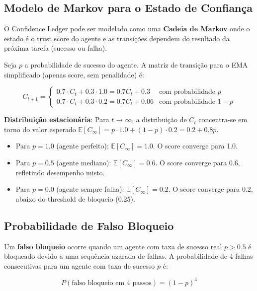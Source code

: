 \subsection{Modelo de Markov para o Estado de Confiança}

O Confidence Ledger pode ser modelado como uma \textbf{Cadeia de Markov} onde o estado é o trust score do agente e as transições dependem do resultado da próxima tarefa (sucesso ou falha).

Seja $p$ a probabilidade de sucesso do agente. A matriz de transição para o EMA simplificado (apenas score, sem penalidade) é:

\begin{equation}
C_{t+1} = \begin{cases}
0.7 \cdot C_t + 0.3 \cdot 1.0 = 0.7 C_t + 0.3 & \text{com probabilidade } p \\
0.7 \cdot C_t + 0.3 \cdot 0.2 = 0.7 C_t + 0.06 & \text{com probabilidade } 1-p
\end{cases}
\end{equation}

\textbf{Distribuição estacionária}: Para $t \to \infty$, a distribuição de $C_t$ concentra-se em torno do valor esperado $\mathbb{E}[C_\infty] = p \cdot 1.0 + (1-p) \cdot 0.2 = 0.2 + 0.8p$.

\begin{itemize}
    \item Para $p = 1.0$ (agente perfeito): $\mathbb{E}[C_\infty] = 1.0$. O score converge para 1.0.
    \item Para $p = 0.5$ (agente mediano): $\mathbb{E}[C_\infty] = 0.6$. O score converge para 0.6, refletindo desempenho misto.
    \item Para $p = 0.0$ (agente sempre falha): $\mathbb{E}[C_\infty] = 0.2$. O score converge para 0.2, abaixo do threshold de bloqueio (0.25).
\end{itemize}

\subsection{Probabilidade de Falso Bloqueio}

Um \textbf{falso bloqueio} ocorre quando um agente com taxa de sucesso real $p > 0.5$ é bloqueado devido a uma sequência azarada de falhas. A probabilidade de 4 falhas consecutivas para um agente com taxa de sucesso $p$ é:

\begin{equation}
P(\text{falso bloqueio em 4 passos}) = (1-p)^4
\end{equation}

